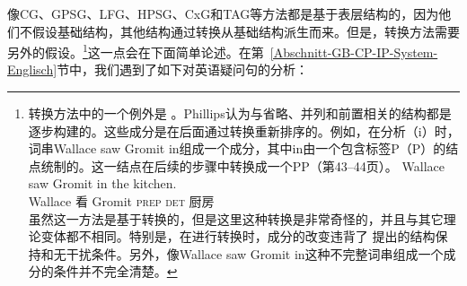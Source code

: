 \noindent
像CG\indexcgc、GPSG\indexgpsgc、LFG\indexlfgc、HPSG\indexhpsgc、CxG\indexcxgc 和TAG\indextagc 等方法都是基于表层结构的，因为他们不假设基础结构，其他结构通过转换从基础结构派生而来。但是，转换方法需要另外的假设。\footnote{%
	转换方法中的一个例外是 。Phillips认为与省略、并列和前置相关的结构都是逐步构建的。这些成分是在后面通过转换重新排序的。例如，在分析（i）时，词串Wallace saw Gromit in组成一个成分，其中in由一个包含标签P（P）的结点统制的。这一结点在后续的步骤中转换成一个PP（第43--44页）。
\ea
\gll Wallace saw Gromit in the kitchen.\\
    Wallace 看 Gromit \textsc{prep} \textsc{det} 厨房\\
\z
虽然这一方法是基于转换的，但是这里这种转换是非常奇怪的，并且与其它理论变体都不相同。特别是，在进行转换时，成分的改变违背了 \citet{Chomsky2008a}提出的结构保持和无干扰条件。另外，像Wallace saw Gromit in这种不完整词串组成一个成分的条件并不完全清楚。%
}这一点会在下面简单论述。在第~\ref{Abschnitt-GB-CP-IP-System-Englisch}节中，我们遇到了如下对英语疑问句的分析：
